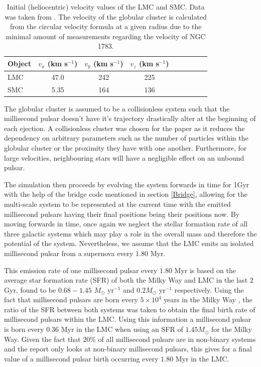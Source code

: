 \begin{table}[htb]
\begin{center}
\begin{tabular}{lcccccccc}
\hline
Object & $v_x$ (km s$^{-1}$) & $v_y$ (km s$^{-1}$) & $v_z$ (km s$^{-1}$)  \\ \hline
LMC &  47.0 & 242 & 225   \\
SMC&	5.35 & 164 & 136 \\\hline
\end{tabular}
\caption{Initial (heliocentric) velocity values of the LMC and SMC. Data was taken from \cite{Simbad}. The velocity of the globular cluster is calculated from the circular velocity formula at a given radius due to the minimal amount of measurements regarding the velocity of NGC 1783.}
\label{velvalues}
\end{center}
\end{table}

\newpage

The globular cluster is assumed to be a collisionless system such that the millisecond pulsar doesn't have it's trajectory drastically alter at the beginning of each ejection. A collisionless cluster was chosen for the paper as it reduces the dependency on arbitrary parameters such as the number of particles within the globular cluster or the proximity they have with one another. Furthermore, for large velocities, neighbouring stars will have a negligible effect on an unbound pulsar.

The simulation then proceeds by evolving the system forwards in time for 1Gyr with the help of the bridge code mentioned in section \ref{Bridge}, allowing for the multi-scale system to be represented at the current time with the emitted millisecond pulsars having their final positions being their positions now. By moving forwards in time, once again we neglect the stellar formation rate of all three galactic systems which may play a role in the overall mass and therefore the potential of the system. Nevertheless, we assume that the LMC emits an isolated millisecond pulsar from a supernova every $1.80$ Myr. 

This emission rate of one millisecond pulsar every $1.80$ Myr is based on the average star formation rate (SFR) of both the Milky Way and LMC in the last $2$Gyr, found to be  $0.68-1.45$ $M_\odot$ yr$^{-1}$ \citep{Thomas} and $0.2 M_\odot$ yr$^{-1}$ \citep{Harris} respectively. Using the fact that millisecond pulsars are born every $5\times10^4$ years in the Milky Way \citep{Lorimer2008}, the ratio of the SFR between both systems was taken to obtain the final birth rate of millisecond pulsars within the LMC. Using this information a millisecond pulsar is born every $0.36$ Myr in the LMC when using an SFR of $1.45 M_\odot$ for the Milky Way. Given the fact that $20\%$ of all millisecond pulsars are in non-binary systems \cite{Lorimer2008} and the report only looks at non-binary millisecond pulsars, this gives for a final value of a millisecond pulsar birth occurring every $1.80$ Myr in the LMC.

